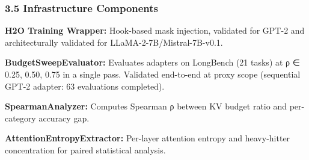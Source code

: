 \subsubsection{3.5 Infrastructure Components}

\textbf{H2O Training Wrapper:} Hook-based mask injection, validated for GPT-2 and architecturally validated for LLaMA-2-7B/Mistral-7B-v0.1.

\textbf{BudgetSweepEvaluator:} Evaluates adapters on LongBench (21 tasks) at ρ ∈ {0.25, 0.50, 0.75} in a single pass. Validated end-to-end at proxy scope (sequential GPT-2 adapter: 63 evaluations completed).

\textbf{SpearmanAnalyzer:} Computes Spearman ρ between KV budget ratio and per-category accuracy gap.

\textbf{AttentionEntropyExtractor:} Per-layer attention entropy and heavy-hitter concentration for paired statistical analysis.

